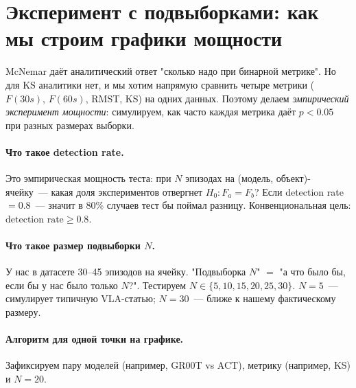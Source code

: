\documentclass[11pt]{article}
\begin{document}
\section{Эксперимент с подвыборками: как мы строим графики мощности}

McNemar даёт аналитический ответ "сколько надо при бинарной метрике". Но для KS аналитики нет, и мы хотим напрямую сравнить четыре метрики ($F(30s)$, $F(60s)$, RMST, KS) на одних данных. Поэтому делаем \emph{эмпирический эксперимент мощности}: симулируем, как часто каждая метрика даёт $p < 0.05$ при разных размерах выборки.

\paragraph{Что такое detection rate.} Это эмпирическая мощность теста: при $N$ эпизодах на (модель, объект)-ячейку~--- какая доля экспериментов отвергнет $H_0: F_a = F_b$? Если detection rate $=0.8$~--- значит в 80\% случаев тест бы поймал разницу. Конвенциональная цель: $\text{detection rate} \ge 0.8$.

\paragraph{Что такое размер подвыборки $N$.} У нас в датасете 30--45 эпизодов на ячейку. "Подвыборка $N$" $=$ "а что было бы, если бы у нас было только $N$?". Тестируем $N \in \{5, 10, 15, 20, 25, 30\}$. $N=5$~--- симулирует типичную VLA-статью; $N=30$~--- ближе к нашему фактическому размеру.

\paragraph{Алгоритм для одной точки на графике.} Зафиксируем пару моделей (например, GR00T vs ACT), метрику (например, KS) и $N=20$.
\end{document}
